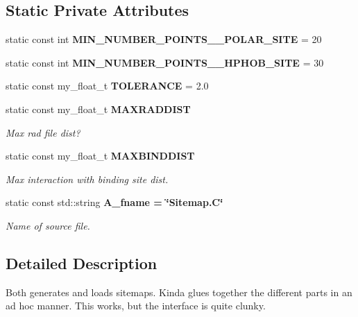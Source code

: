 \subsection*{Static Private Attributes}
\begin{CompactItemize}
\item 
static const int \textbf{MIN\_\-NUMBER\_\-POINTS\_\-\_\-POLAR\_\-SITE} = 20\label{classASCbase_1_1Sitemap_693e69f1d3787c869c7510692bcd0e91}

\item 
static const int \textbf{MIN\_\-NUMBER\_\-POINTS\_\-\_\-HPHOB\_\-SITE} = 30\label{classASCbase_1_1Sitemap_fd1fc07d472e969eb867e04bbe1170e6}

\item 
static const my\_\-float\_\-t \textbf{TOLERANCE} = 2.0\label{classASCbase_1_1Sitemap_872ebaa52aa3fdf3501804dd35077f84}

\item 
static const my\_\-float\_\-t \bf{MAXRADDIST}\label{classASCbase_1_1Sitemap_5eeb7fdc83ae79798995a668a58b42e1}

\begin{CompactList}\small\item\em Max rad file dist? \item\end{CompactList}\item 
static const my\_\-float\_\-t \bf{MAXBINDDIST}\label{classASCbase_1_1Sitemap_7cf5dd107e339908dc8ca026eba23360}

\begin{CompactList}\small\item\em Max interaction with binding site dist. \item\end{CompactList}\item 
static const std::string \bf{A\_\-fname} = \char`\"{}Sitemap.C\char`\"{}\label{classASCbase_1_1Sitemap_b28ac13500885c7b52d35446d3fa89de}

\begin{CompactList}\small\item\em Name of source file. \item\end{CompactList}\end{CompactItemize}


\subsection{Detailed Description}
Both generates and loads sitemaps. Kinda glues together the different parts in an ad hoc manner. This works, but the interface is quite clunky. 




